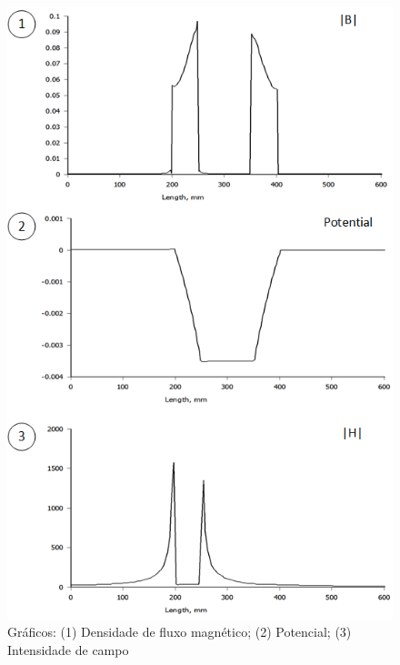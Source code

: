 \begin{figure}[H]
\centering
\includegraphics[scale=0.7]{img/assig2/results_2.png}
\caption[Gráficos]{Gráficos: (1) Densidade de fluxo magnético; (2) Potencial; (3) Intensidade de campo}
\label{lua_mesh}
\end{figure}


